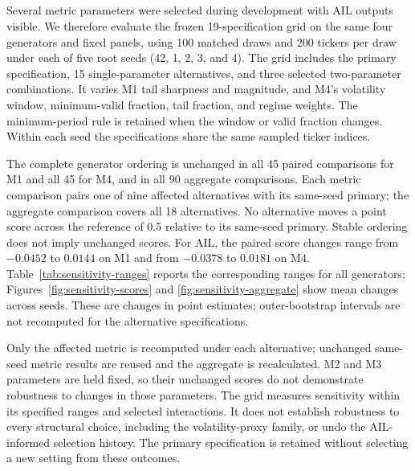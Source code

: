 \subsection{}\label{sec:sensitivity}
{\color{red}
Several metric parameters were selected during development with AIL outputs
visible. We therefore evaluate the frozen 19-specification grid on the same
four generators and fixed panels, using 100 matched draws and 200 tickers
per draw under each of five root seeds (42, 1, 2, 3, and 4).
The grid includes the primary specification, 15 single-parameter alternatives,
and three selected two-parameter combinations.
It varies M1 tail sharpness and magnitude, and M4's volatility window,
minimum-valid fraction, tail fraction, and regime weights.
The minimum-period rule is retained when the window or valid fraction changes.
Within each seed the specifications share the same sampled ticker indices.

The complete generator ordering is unchanged in all 45 paired comparisons
for M1 and all 45 for M4, and in all 90 aggregate comparisons.
Each metric comparison pairs one of nine affected alternatives with its
same-seed primary; the aggregate comparison covers all 18 alternatives.
No alternative moves a point score across the reference of 0.5 relative
to its same-seed primary.
Stable ordering does not imply unchanged scores.
For AIL, the paired score changes range from $-0.0452$ to $0.0144$ on M1
and from $-0.0378$ to $0.0181$ on M4.
Table~\ref{tab:sensitivity-ranges} reports the corresponding ranges for
all generators; Figures~\ref{fig:sensitivity-scores} and
\ref{fig:sensitivity-aggregate} show mean changes across seeds.
These are changes in point estimates; outer-bootstrap intervals are not
recomputed for the alternative specifications.

Only the affected metric is recomputed under each alternative; unchanged
same-seed metric results are reused and the aggregate is recalculated.
M2 and M3 parameters are held fixed, so their unchanged scores do not
demonstrate robustness to changes in those parameters.
The grid measures sensitivity within its specified ranges and selected
interactions. It does not establish robustness to every structural choice,
including the volatility-proxy family, or undo the AIL-informed selection
history. The primary specification is retained without selecting a new setting from
these outcomes.
}

